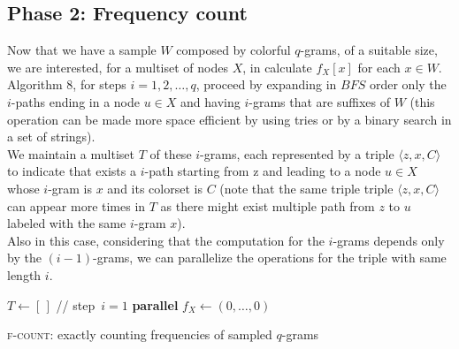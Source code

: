 \clearpage
\subsection*{Phase 2: Frequency count}

Now that we have a sample $W$ composed by colorful $q$-grams, of a suitable size, 
we are interested, for a multiset of nodes $X$, in calculate $f_{X}[x]$ for each $x \in W$.
Algorithm 8, for steps $i = 1, 2, \ldots, q$, proceed by expanding in $BFS$ order only the
$i$-paths ending in a node $u \in X$ and having $i$-grams that are suffixes of $W$
(this operation can be made more space efficient by using tries or by a binary search in a set of strings).\\

We maintain a multiset $T$ of these $i$-grams, each represented by a triple $\langle z, x, C \rangle$
to indicate that exists a $i$-path starting from z and leading to a node $u \in X$ whose $i$-gram is $x$
and its colorset is $C$ (note that the same triple triple $\langle z, x, C \rangle$ can appear more times in $T$ 
as there might exist multiple path from $z$ to $u$ labeled with the same $i$-gram $x$).\\

Also in this case, considering that the computation for the $i$-grams depends only by the $(i-1)$-grams,
we can parallelize the operations for the triple with same length $i$.

\begin{algorithm}[h]

\small
\DontPrintSemicolon
{}
\BlankLine
$T\gets[\,]$ \quad // step~$i=1$\; 
\BlankLine
\textbf{parallel} 
\BlankLine
{}
\BlankLine
$f_X \gets (0,\ldots,0)$\;
\BlankLine
{}
\BlankLine
\caption{\textsc{f-count}: exactly counting frequencies of sampled $q$-grams}
\label{alg:frequency}
\end{algorithm}

